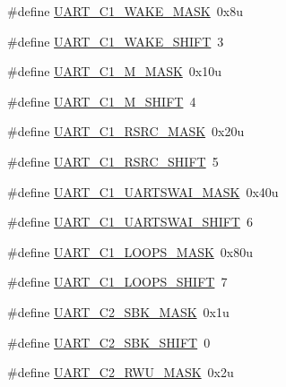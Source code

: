 \begin{DoxyCompactItemize}
\item 
\#define \hyperlink{group___u_a_r_t___register___masks_ga84ef48b565c1e3526a3c392b8ce9cf83}{U\+A\+R\+T\+\_\+\+C1\+\_\+\+W\+A\+K\+E\+\_\+\+M\+A\+SK}~0x8u
\item 
\#define \hyperlink{group___u_a_r_t___register___masks_gac7a94bf100cb9654ac28fe9e58b1db42}{U\+A\+R\+T\+\_\+\+C1\+\_\+\+W\+A\+K\+E\+\_\+\+S\+H\+I\+FT}~3
\item 
\#define \hyperlink{group___u_a_r_t___register___masks_gabbe5c7cb60072d535d068446606414c5}{U\+A\+R\+T\+\_\+\+C1\+\_\+\+M\+\_\+\+M\+A\+SK}~0x10u
\item 
\#define \hyperlink{group___u_a_r_t___register___masks_ga591070f161ecf5cf35b0e6927b5e4c77}{U\+A\+R\+T\+\_\+\+C1\+\_\+\+M\+\_\+\+S\+H\+I\+FT}~4
\item 
\#define \hyperlink{group___u_a_r_t___register___masks_gaaeb3cc3491cd77f71150bfa9cce03518}{U\+A\+R\+T\+\_\+\+C1\+\_\+\+R\+S\+R\+C\+\_\+\+M\+A\+SK}~0x20u
\item 
\#define \hyperlink{group___u_a_r_t___register___masks_gac773b486d570b26d17a7d522016f683a}{U\+A\+R\+T\+\_\+\+C1\+\_\+\+R\+S\+R\+C\+\_\+\+S\+H\+I\+FT}~5
\item 
\#define \hyperlink{group___u_a_r_t___register___masks_ga466f5bf7b0cd3c3517da3a6c6a9baaac}{U\+A\+R\+T\+\_\+\+C1\+\_\+\+U\+A\+R\+T\+S\+W\+A\+I\+\_\+\+M\+A\+SK}~0x40u
\item 
\#define \hyperlink{group___u_a_r_t___register___masks_gac7888d995fd947613eea08bdee534ffc}{U\+A\+R\+T\+\_\+\+C1\+\_\+\+U\+A\+R\+T\+S\+W\+A\+I\+\_\+\+S\+H\+I\+FT}~6
\item 
\#define \hyperlink{group___u_a_r_t___register___masks_ga08f1bbd905640d81967f9fb6d4ed8ec8}{U\+A\+R\+T\+\_\+\+C1\+\_\+\+L\+O\+O\+P\+S\+\_\+\+M\+A\+SK}~0x80u
\item 
\#define \hyperlink{group___u_a_r_t___register___masks_gac6beea8a7bad0b0fc3c3535f629fcf3a}{U\+A\+R\+T\+\_\+\+C1\+\_\+\+L\+O\+O\+P\+S\+\_\+\+S\+H\+I\+FT}~7
\item 
\#define \hyperlink{group___u_a_r_t___register___masks_ga8d243e5b3a3ece12bdeca818bacb15ee}{U\+A\+R\+T\+\_\+\+C2\+\_\+\+S\+B\+K\+\_\+\+M\+A\+SK}~0x1u
\item 
\#define \hyperlink{group___u_a_r_t___register___masks_ga94f62ff8a45a08ae54b40da725fb245b}{U\+A\+R\+T\+\_\+\+C2\+\_\+\+S\+B\+K\+\_\+\+S\+H\+I\+FT}~0
\item 
\#define \hyperlink{group___u_a_r_t___register___masks_ga279868a42acca3c1eeba8c53bb94b208}{U\+A\+R\+T\+\_\+\+C2\+\_\+\+R\+W\+U\+\_\+\+M\+A\+SK}~0x2u
\item 

\end{DoxyCompactItemize}
